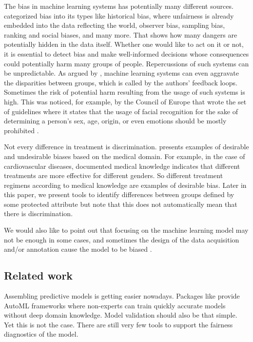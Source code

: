 The bias in machine learning systems has potentially many different
sources. \citet{mehrabi2019survey} categorized bias into its types like
historical bias, where unfairness is already embedded into the data
reflecting the world, observer bias, sampling bias, ranking and social
biases, and many more. That shows how many dangers are potentially
hidden in the data itself. Whether one would like to act on it or not,
it is essential to detect bias and make well-informed decisions whose
consequences could potentially harm many groups of people. Repercussions
of such systems can be unpredictable. As argued by
\citet{barocas-hardt-narayanan}, machine learning systems can even
aggravate the disparities between groups, which is called by the
authors' feedback loops. Sometimes the risk of potential harm resulting
from the usage of such systems is high. This was noticed, for example,
by the Council of Europe that wrote the set of guidelines where it
states that the usage of facial recognition for the sake of determining
a person's sex, age, origin, or even emotions should be mostly
prohibited \citep{facialrecognition}.

Not every difference in treatment is discrimination.
\citet{cirillo_sex_2020} presents examples of desirable and undesirable
biases based on the medical domain. For example, in the case of
cardiovascular diseases, documented medical knowledge indicates that
different treatments are more effective for different genders. So
different treatment regimens according to medical knowledge are examples
of desirable bias. Later in this paper, we present tools to identify
differences between groups defined by some protected attribute but note
that this does not automatically mean that there is discrimination.

We would also like to point out that focusing on the machine learning
model may not be enough in some cases, and sometimes the design of the
data acquisition and/or annotation cause the model to be biased
\citep{barocas-hardt-narayanan}.

\hypertarget{related-work}{%
\subsection{Related work}\label{related-work}}

Assembling predictive models is getting easier nowadays. Packages like
 \citep{H2OAutoML} provide AutoML frameworks where
non-experts can train quickly accurate models without deep domain
knowledge. Model validation should also be that simple. Yet this is not
the case. There are still very few tools to support the fairness
diagnostics of the model.


